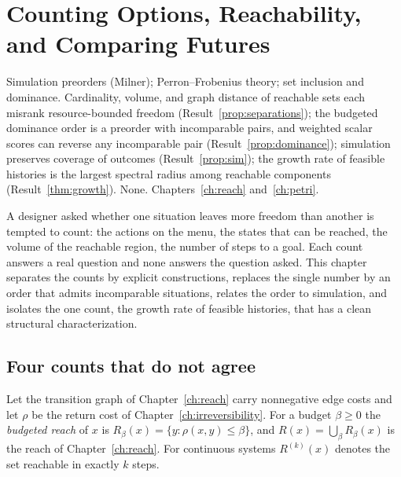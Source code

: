 \chapter[Counting Options and Comparing Futures]{Counting Options, Reachability, and Comparing Futures}\label{ch:counting}
{Simulation preorders (Milner); Perron--Frobenius theory; set inclusion and dominance.}
{Cardinality, volume, and graph distance of reachable sets each misrank resource-bounded freedom (Result~\ref{prop:separations}); the budgeted dominance order is a preorder with incomparable pairs, and weighted scalar scores can reverse any incomparable pair (Result~\ref{prop:dominance}); simulation preserves coverage of outcomes (Result~\ref{prop:sim}); the growth rate of feasible histories is the largest spectral radius among reachable components (Result~\ref{thm:growth}).}
{None.}
{Chapters~\ref{ch:reach} and~\ref{ch:petri}.}

A designer asked whether one situation leaves more freedom than another is tempted to count: the actions on the menu, the states that can be reached, the volume of the reachable region, the number of steps to a goal. Each count answers a real question and none answers the question asked. This chapter separates the counts by explicit constructions, replaces the single number by an order that admits incomparable situations, relates the order to simulation, and isolates the one count, the growth rate of feasible histories, that has a clean structural characterization.

\section{Four counts that do not agree}

Let the transition graph of Chapter~\ref{ch:reach} carry nonnegative edge costs and let $\rho$ be the return cost of Chapter~\ref{ch:irreversibility}. For a budget $\beta\ge0$ the \emph{budgeted reach} of $x$ is $R_\beta(x)=\{y:\rho(x,y)\le\beta\}$, and $R(x)=\bigcup_\beta R_\beta(x)$ is the reach of Chapter~\ref{ch:reach}. For continuous systems $R^{(k)}(x)$ denotes the set reachable in exactly $k$ steps.

